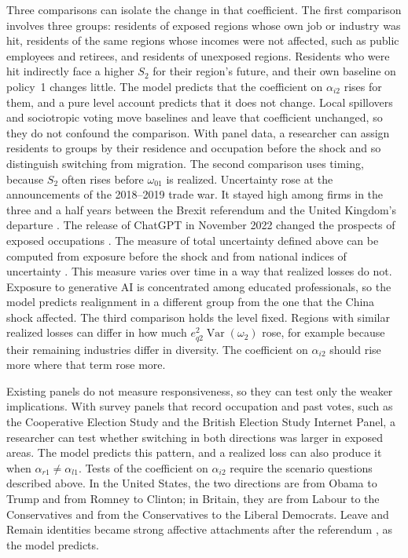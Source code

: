 \documentclass[12pt,letterpaper]{article}
\begin{document}
Three comparisons can isolate the change in that coefficient. The first comparison involves three groups: residents of exposed regions whose own job or industry was hit, residents of the same regions whose incomes were not affected, such as public employees and retirees, and residents of unexposed regions. Residents who were hit indirectly face a higher $S_2$ for their region's future, and their own baseline on policy~1 changes little. The model predicts that the coefficient on $\alpha_{i2}$ rises for them, and a pure level account predicts that it does not change. Local spillovers and sociotropic voting move baselines and leave that coefficient unchanged, so they do not confound the comparison. With panel data, a researcher can assign residents to groups by their residence and occupation before the shock and so distinguish switching from migration. The second comparison uses timing, because $S_2$ often rises before $\omega_{01}$ is realized. Uncertainty rose at the announcements of the 2018--2019 trade war. It stayed high among firms in the three and a half years between the Brexit referendum and the United Kingdom's departure \citep{BloomEtAl2019}. The release of ChatGPT in November 2022 changed the prospects of exposed occupations \citep{EloundouEtAl2024,FeltenRajSeamans2021}. The measure of total uncertainty defined above can be computed from exposure before the shock and from national indices of uncertainty \citep{BakerBloomDavis2016,CaldaraEtAl2020}. This measure varies over time in a way that realized losses do not. Exposure to generative AI is concentrated among educated professionals, so the model predicts realignment in a different group from the one that the China shock affected. The third comparison holds the level fixed. Regions with similar realized losses can differ in how much $e_{q2}^2\operatorname{Var}(\omega_2)$ rose, for example because their remaining industries differ in diversity. The coefficient on $\alpha_{i2}$ should rise more where that term rose more.

Existing panels do not measure responsiveness, so they can test only the weaker implications. With survey panels that record occupation and past votes, such as the Cooperative Election Study and the British Election Study Internet Panel, a researcher can test whether switching in both directions was larger in exposed areas. The model predicts this pattern, and a realized loss can also produce it when $\alpha_{r1}\ne\alpha_{l1}$. Tests of the coefficient on $\alpha_{i2}$ require the scenario questions described above. In the United States, the two directions are from Obama to Trump and from Romney to Clinton; in Britain, they are from Labour to the Conservatives and from the Conservatives to the Liberal Democrats. Leave and Remain identities became strong affective attachments after the referendum \citep{HoboltLeeperTilley2021}, as the model predicts.
\end{document}
